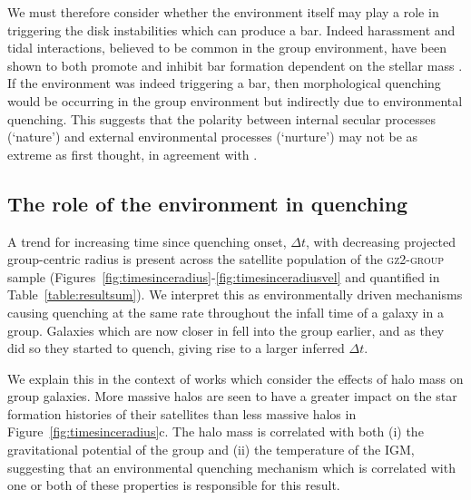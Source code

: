 \documentclass[useAMS,usenatbib]{mn2e}
\begin{document}
We must therefore consider whether the environment itself may play a role in triggering the disk instabilities which can produce a bar. Indeed harassment and tidal interactions, believed to be common in the group environment, have been shown to both promote and inhibit bar formation dependent on the stellar mass \citep{noguchi88, moore96, skibba12}.  If the environment was indeed triggering a bar, then morphological quenching would be occurring in the group environment but indirectly due to environmental quenching. This suggests that the polarity between internal secular processes (`nature') and external environmental processes (`nurture') may not be as extreme as first thought, in agreement with \cite{skibba12}. 

\subsection{The role of the environment in quenching}\label{sec:roleenv}

A trend for increasing time since quenching onset, $\Delta t$, with decreasing projected group-centric radius is present across the satellite population of the \textsc{gz2-group} sample (Figures~\ref{fig:timesinceradius}-\ref{fig:timesinceradiusvel} and quantified in Table~\ref{table:resultsum}). We interpret this as environmentally driven mechanisms causing quenching at the same rate throughout the infall time of a galaxy in a group. Galaxies which are now closer in fell into the group earlier, and as they did so they started to quench, giving rise to a larger inferred $\Delta t$.

We explain this in the context of works which consider the effects of halo mass on group galaxies. More massive halos are seen to have a greater impact on the star formation histories of their satellites than less massive halos in Figure~\ref{fig:timesinceradius}c. The halo mass is correlated with both (i) the gravitational potential of the group and (ii) the temperature of the IGM, suggesting that an environmental quenching mechanism which is correlated with one or both of these properties is responsible for this result.
\end{document}
